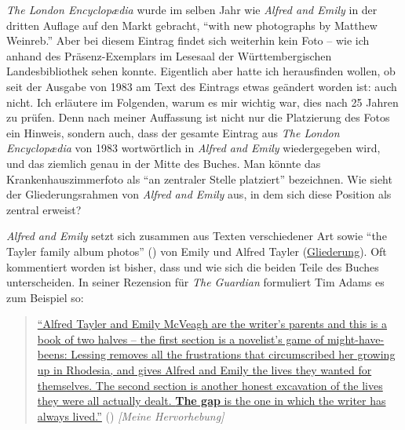 \documentclass[fontsize=12pt]{scrartcl}
\begin{document}
\textit{The London Encyclop{\ae}dia} wurde im selben Jahr wie \textit{Alfred and Emily} in der dritten Auflage auf den Markt gebracht, "`with new photographs by Matthew Weinreb."' Aber bei diesem Eintrag findet sich weiterhin kein Foto -- wie ich anhand des Pr\"asenz-Exemplars im Lesesaal der W\"urttembergischen Landesbibliothek sehen konnte. Eigentlich aber hatte ich he\-rausfinden wollen, ob seit der Ausgabe von 1983 am Text des Eintrags etwas ge\"andert worden ist: auch nicht. Ich erl\"autere im Folgenden, warum es mir wichtig war, dies nach 25 Jahren zu pr\"ufen. Denn nach meiner Auffassung ist nicht nur die Platzierung des Fotos ein Hinweis, sondern auch, dass der gesamte Eintrag aus \textit{The London Encyclop{\ae}dia} von 1983 wortw\"ortlich in \textit{Alfred and Emily} wiedergegeben wird, und das ziemlich genau in der Mitte des Buches. Man k\"onnte das Krankenhauszimmerfoto als "`an zentraler Stelle platziert"' be\-zeichnen. Wie sieht der Gliederungsrahmen von \textit{Alfred and Emily} aus, in dem sich diese Position als zentral erweist? 

\textit{Alfred and Emily} setzt sich zusammen aus Texten verschiedener Art sowie "`the Tayler family album photos"' (\cite{Tiger2009}) von Emily und Alfred Tayler (\href{https://de.wikipedia.org/w/index.php?title=Alfred_und_Emily&oldid=138028858#Gliederung_.28Originalausgabe.29}{Gliederung}). Oft kommentiert worden ist bis\-her, dass und wie sich die beiden Teile des Buches unterscheiden. In seiner Rezension f\"ur \textit{The Guardian} formuliert Tim Adams es zum Beispiel so: 

\singlespacing
\begin{quote}
\href{http://www.theguardian.com/books/2008/may/11/fiction.biography}{"`Alfred Tayler and Emily McVeagh are the writer's parents and this is a book of two halves -- the first section is a novelist's game of might-have-beens: Lessing removes all the frustrations that circumscribed her growing up in Rhodesia, and gives Alfred and Emily the lives they wanted for themselves. The second section is another honest excavation of the lives they were all actually dealt. \textbf{The gap} is the one in which the writer has always lived."'} (\cite{Adams2008}) \textit{[Meine Hervorhebung]}
\end{quote} 
\onehalfspacing
\end{document}
